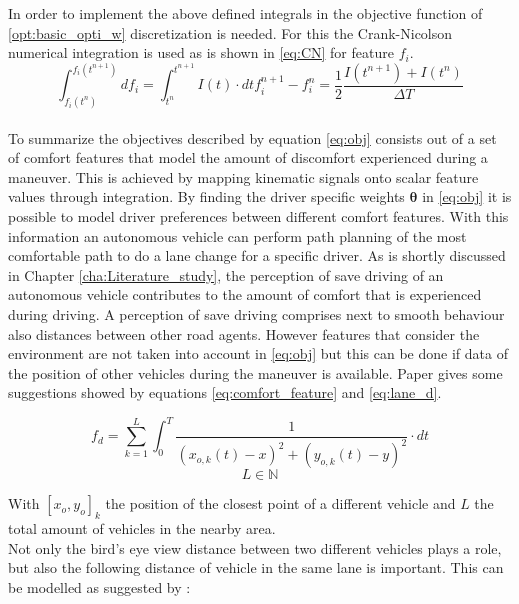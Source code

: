 In order to implement the above defined integrals in the objective function of \ref{opt:basic_opti_w} discretization is needed. For this the Crank-Nicolson numerical integration is used as is shown in \ref{eq:CN} for feature $f_i$. 
\begin{subequations}\label{eq:CN}
	\begin{equation}
	\int_{f_i(t^n)}^{f_i(t^{n+1})}df_i=\int_{t^n}^{t^{n+1}} I(t) \cdot dt	
	\end{equation}
	\begin{equation}
	f_i^{n+1} -f_i^{n} = \frac{1}{2}\frac{I(t^{n+1})+I(t^n)}{\Delta T}
	\end{equation}
\end{subequations}\\

To summarize the objectives described by equation \ref{eq:obj} consists out of a set of comfort features that model the amount of discomfort experienced during a maneuver. This is achieved by mapping kinematic signals onto scalar feature values through integration. By finding the driver specific weights $\bm{\theta}$ in \ref{eq:obj} it is possible to model driver preferences between different comfort features. With this information an autonomous vehicle can perform path planning of the most comfortable path to do a lane change for a specific driver. As is shortly discussed in Chapter \ref{cha:Literature_study}, the perception of save driving of an autonomous vehicle contributes to the amount of comfort that is experienced during driving. A perception of save driving comprises next to smooth behaviour also distances between other road agents. However features that consider the environment are not taken into account in \ref{eq:obj} but this can be done if data of the position of other vehicles during the maneuver is available. Paper \cite{Kuderer2015a} gives some suggestions showed by equations \ref{eq:comfort_feature} and  \ref{eq:lane_d}.  

\begin{equation}\label{eq:comfort_feature}
f_d= \sum_{k = 1}^{L}\int_{0}^{T}\frac{1}{(x_{o,k}(t)-x)^2+(y_{o,k}(t)-y)^2}\cdot dt
\end{equation}
\[L \in \mathbb{N}\]

With $[x_o,y_o]_k$ the position of the closest point of a different vehicle and $L$ the total amount of vehicles in the nearby area.\\

Not only the bird's eye view distance between two different vehicles plays a role, but also the following distance of vehicle in the same lane is important. This can be modelled as suggested by \cite{Kuderer2015a}:  

